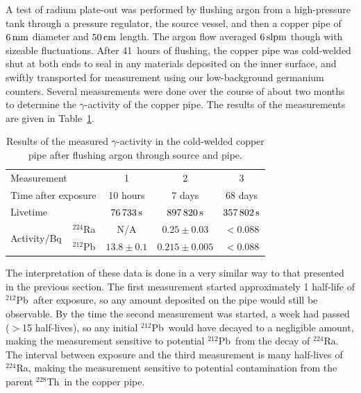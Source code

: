 A test of radium plate-out was performed by flushing argon from a high-pressure tank through a pressure regulator, the source vessel, and then a copper pipe of $6\,\mathrm{mm}$ diameter and $50\,\mathrm{cm}$ length. The argon flow averaged $6\,\mathrm{slpm}$ though with sizeable fluctuations. After 41~hours of flushing, the copper pipe was cold-welded shut at both ends to seal in any materials deposited on the inner surface, and swiftly transported for measurement using our low-background germanium counters. Several measurements were done over the course of about two months to determine the $\gamma$-activity of the copper pipe. The results of the measurements are given in Table~\ref{tab:flush_meas}.
\begin{table}[htb]
\centering
    \caption{Results of the measured $\gamma$-activity in the cold-welded copper pipe after flushing argon through source and pipe.}
    \label{tab:flush_meas}
    \renewcommand{\arraystretch}{1.2}
    \begin{tabular}{|llccc|}
        \hline\hline
        \multicolumn{2}{|l}{Measurement} & 1 & 2 & 3 \\
        \multicolumn{2}{|l}{Time after exposure} & 10 hours & 7 days & 68 days \\
        \multicolumn{2}{|l}{Livetime} & $76\,733\,\mathrm{s}$ & $897\,820\,\mathrm{s}$ & $357\,802\,\mathrm{s}$ \\ \hline
        \multirow{2}{*}{Activity/Bq}
        & $^{224}$Ra & N/A & $0.25\pm0.03$ & $<0.088$ \\
        & $^{212}$Pb & $13.8\pm0.1$ & $0.215\pm0.005$ & $<0.088$ \\
        \hline\hline
    \end{tabular}
\end{table}

The interpretation of these data is done in a very similar way to that presented in the previous section. The first measurement started approximately 1 half-life of $^{212}$Pb~after exposure, so any amount deposited on the pipe would still be observable. By the time the second measurement was started, a week had passed ($>$15 half-lives), so any initial $^{212}$Pb~would have decayed to a negligible amount, making the measurement sensitive to potential $^{212}$Pb~from the decay of $^{224}$Ra. The interval between exposure and the third measurement is many half-lives of $^{224}$Ra, making the measurement sensitive to potential contamination from the parent $^{228}$Th~in the copper pipe.

